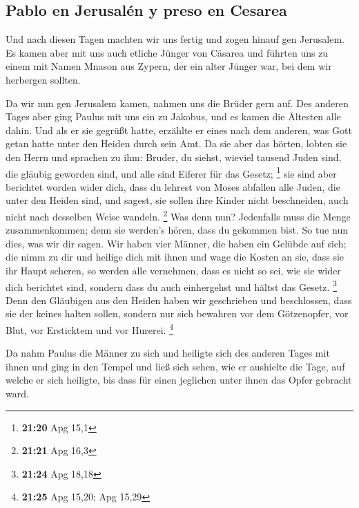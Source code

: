 \hypertarget{pablo-en-jerusaluxe9n-y-preso-en-cesarea}{%
\subsection{Pablo en Jerusalén y preso en
Cesarea}\label{pablo-en-jerusaluxe9n-y-preso-en-cesarea}}

 Und nach diesen Tagen machten wir uns fertig und zogen
hinauf gen Jerusalem.  Es kamen aber mit uns auch etliche
Jünger von Cäsarea und führten uns zu einem mit Namen Mnason aus Zypern,
der ein alter Jünger war, bei dem wir herbergen sollten.

 Da wir nun gen Jerusalem kamen, nahmen uns die Brüder
gern auf.  Des anderen Tages aber ging Paulus mit uns ein
zu Jakobus, und es kamen die Ältesten alle dahin.  Und
als er sie gegrüßt hatte, erzählte er eines nach dem anderen, was Gott
getan hatte unter den Heiden durch sein Amt.  Da sie aber
das hörten, lobten sie den Herrn und sprachen zu ihm: Bruder, du siehst,
wieviel tausend Juden sind, die gläubig geworden sind, und alle sind
Eiferer für das Gesetz; \footnote{\textbf{21:20} Apg 15,1}
 sie sind aber berichtet worden wider dich, dass du
lehrest von Moses abfallen alle Juden, die unter den Heiden sind, und
sagest, sie sollen ihre Kinder nicht beschneiden, auch nicht nach
desselben Weise wandeln. \footnote{\textbf{21:21} Apg 16,3}
 Was denn nun? Jedenfalls muss die Menge zusammenkommen;
denn sie werden's hören, dass du gekommen bist.  So tue
nun dies, was wir dir sagen.  Wir haben vier Männer, die
haben ein Gelübde auf sich; die nimm zu dir und heilige dich mit ihnen
und wage die Kosten an sie, dass sie ihr Haupt scheren, so werden alle
vernehmen, dass es nicht so sei, wie sie wider dich berichtet sind,
sondern dass du auch einhergehst und hältst das Gesetz. \footnote{\textbf{21:24}
  Apg 18,18}  Denn den Gläubigen aus den Heiden haben wir
geschrieben und beschlossen, dass sie der keines halten sollen, sondern
nur sich bewahren vor dem Götzenopfer, vor Blut, vor Ersticktem und vor
Hurerei. \footnote{\textbf{21:25} Apg 15,20; Apg 15,29}

 Da nahm Paulus die Männer zu sich und heiligte sich des
anderen Tages mit ihnen und ging in den Tempel und ließ sich sehen, wie
er aushielte die Tage, auf welche er sich heiligte, bis dass für einen
jeglichen unter ihnen das Opfer gebracht ward.

